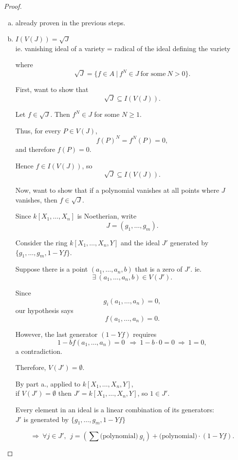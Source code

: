 \documentclass{article}
\theoremstyle{definition}
\begin{document}
\begin{proof}
  \begin{enumerate}[a.]
  \item already proven in the previous steps.
    
  \item $I(V(J)) = \sqrt{J}$\\
  ie. vanishing ideal of a variety = radical of the ideal defining the variety

  where
  $$\sqrt{J} = \{ f \in A ~|~ f^N \in J ~\text{for some}~ N>0 \}.$$

  First, want to show that
  $$\sqrt{J}\subseteq I(V(J)).$$

  Let $f\in\sqrt{J}$. Then $f^N\in J$ for some $N\geq 1$.

  Thus, for every $P\in V(J)$,
  $$f(P)^N=f^N(P)=0,$$
  and therefore $f(P)=0$.

  Hence $f\in I(V(J))$, so
  $$\sqrt{J}\subseteq I(V(J)).$$

  Now, want to show that if a polynomial vanishes at all points where $J$ vanishes, then $f \in \sqrt{J}$.

  Since $k[X_1,\ldots,X_n]$ is Noetherian, write
  $$J=(g_1,\ldots,g_m).$$

  Consider the ring $k[X_1, \ldots, X_n, Y]$ and the ideal $J'$ generated by $\{ g_1, \ldots, g_m, 1-Y f \}$.

  Suppose there is a point $(a_1, \ldots, a_n,b)$ that is a zero of $J'$. ie.
  $$\exists~ (a_1, \ldots, a_n,b) \in V(J').$$

  Since
  $$g_i(a_1,\ldots,a_n)=0,$$
  our hypothesis says
  $$f(a_1,\ldots,a_n)=0.$$

  However, the last generator $(1-Yf)$ requires
  $$1 - b f(a_1,\ldots,a_n) = 0 ~~\Longrightarrow~ 1 - b \cdot 0 = 0 ~\Longrightarrow~ 1=0,$$
  a contradiction.

  Therefore, $V(J') = \emptyset$.

  \vspace{0.4cm}

  By part a., applied to $k[X_1,\ldots,X_n,Y]$,\\
  \hspace*{2em} if $V(J')=\emptyset$ then $J'=k[X_1,\ldots,X_n,Y]$, so $1 \in J'$.

  Every element in an ideal is a linear combination of its generators:\\
  $J'$ is generated by $\{ g_1, \ldots, g_m, 1-Yf \}$

  $$\Longrightarrow~ \forall j \in J',~~ j=(\sum \text{(polynomial)}~ g_i) + \text{(polynomial)} \cdot (1 - Yf).$$


\end{enumerate}
\end{proof}
\end{document}
